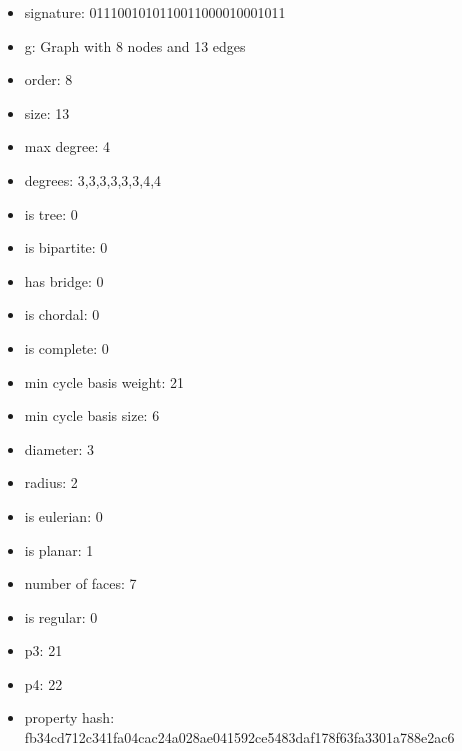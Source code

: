 \begin{itemize}
\item signature: 0111001010110011000010001011
\item g: Graph with 8 nodes and 13 edges
\item order: 8
\item size: 13
\item max degree: 4
\item degrees: 3,3,3,3,3,3,4,4
\item is tree: 0
\item is bipartite: 0
\item has bridge: 0
\item is chordal: 0
\item is complete: 0
\item min cycle basis weight: 21
\item min cycle basis size: 6
\item diameter: 3
\item radius: 2
\item is eulerian: 0
\item is planar: 1
\item number of faces: 7
\item is regular: 0
\item p3: 21
\item p4: 22
\item property hash: fb34cd712c341fa04cac24a028ae041592ce5483daf178f63fa3301a788e2ac6
\end{itemize}
\newpage
\begin{figure}
\end{figure}
